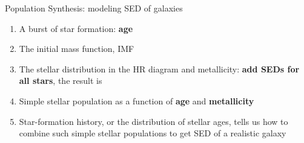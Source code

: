 \documentclass[letterpaper,landscape]{slides}
\begin{document}
\begin{slide}
{\begin{minipage}[t]{13cm}
\begin{center}

\end{center}
\end{minipage}

\begin{minipage}[t]{11cm}
\begin{center}
\vskip -1in
{\large \color{red} Population Synthesis: modeling SED of galaxies }
\end{center}


\begin{enumerate}
\item {\color{blue} A burst of star formation:} {\bf age}
\item {\color{blue} The initial mass function, IMF}
\item {\color{blue} The stellar distribution in the HR diagram} and metallicity: {\bf add 
                    SEDs for all stars}, the result is
\item {\color{blue} Simple stellar population} as a function of {\bf age} and {\bf metallicity} 
\item {\color{blue} Star-formation history}, or the distribution of stellar ages,
      tells us how to combine such simple stellar populations to get SED of a realistic
      galaxy
\end{enumerate}

\end{minipage}}
\vfill 
\end{slide}
\end{document}
